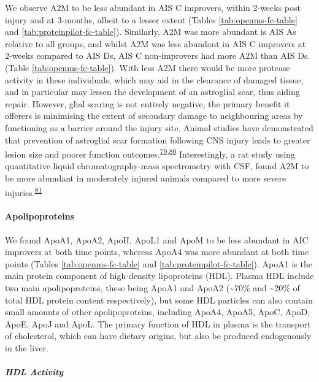 \documentclass[
]{article}
\begin{document}
We observe A2M to be less abundant in AIS C improvers, within 2-weeks post injury and at 3-months, albeit to a lesser extent (Tables \ref{tab:openms-fc-table} and \ref{tab:proteinpilot-fc-table}).
Similarly, A2M was more abundant is AIS As relative to all groups, and whilst A2M was less abundant in AIS C improvers at 2-weeks compared to AIS Ds, AIS C non-improvers had more A2M than AIS Ds. (Table \ref{tab:openms-fc-table}).
With less A2M there would be more protease activity in these individuals, which may aid in the clearance of damaged tissue, and in particular may lessen the development of an astroglial scar, thus aiding repair.
However, glial scaring is not entirely negative, the primary benefit it offerers is minimising the extent of secondary damage to neighbouring areas by functioning as a barrier around the injury site.
Animal studies have demonstrated that prevention of astroglial scar formation following CNS injury leads to greater lesion size and poorer function outcomes.\textsuperscript{\protect\hyperlink{ref-anderson_astrocyte_2016}{79},\protect\hyperlink{ref-wilhelmsson_redefining_2006}{80}}
Interestingly, a rat study using quantitative liquid chromatography-mass spectrometry with CSF, found A2M to be more abundant in moderately injured animals compared to more severe injuries.\textsuperscript{\protect\hyperlink{ref-lubieniecka_biomarkers_2011}{81}}

\hypertarget{apolipoproteins}{%
\paragraph{Apolipoproteins}\label{apolipoproteins}}

We found ApoA1, ApoA2, ApoH, ApoL1 and ApoM to be less abundant in AIC improvers at both time points, whereas ApoA4 was more abundant at both time points (Tables \ref{tab:openms-fc-table} and \ref{tab:proteinpilot-fc-table}).
ApoA1 is the main protein component of high-density lipoproteins (HDL).
Plasma HDL include two main apolipoproteins, these being ApoA1 and ApoA2 (\textasciitilde70\% and \textasciitilde20\% of total HDL protein content respectively), but some HDL particles can also contain small amounts of other apolipoproteins, including ApoA4, ApoA5, ApoC, ApoD, ApoE, ApoJ and ApoL.
The primary function of HDL in plasma is the transport of cholesterol, which can have dietary origins, but also be produced endogenously in the liver.

\hypertarget{hdl-activity}{%
\subparagraph{HDL Activity}\label{hdl-activity}}
\end{document}

